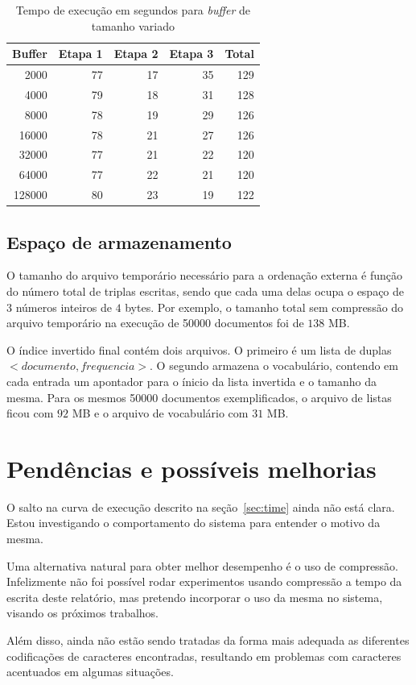 \documentclass[12pt]{article}
\begin{document}
\begin{table}[ht]
\centering
\caption{Tempo de execução em segundos para \emph{buffer} de tamanho variado}
\label{tab:exec_time_buffer}
\begin{tabular}{rrrrr}
Buffer  & Etapa 1 & Etapa 2 & Etapa 3 & Total \\ \hline
2000    & 77      & 17      & 35      & 129 \\
4000    & 79      & 18      & 31      & 128 \\
8000    & 78      & 19      & 29      & 126 \\
16000   & 78      & 21      & 27      & 126 \\
32000   & 77      & 21      & 22      & 120 \\
64000   & 77      & 22      & 21      & 120 \\
128000  & 80      & 23      & 19      & 122 \\

\end{tabular}
\end{table}


\subsection{Espaço de armazenamento}

O tamanho do arquivo temporário necessário para a ordenação externa é função do número total de triplas escritas, sendo que cada uma delas ocupa o espaço de $3$ números inteiros de $4$ bytes. Por exemplo, o tamanho total sem compressão do arquivo temporário na execução de 50000 documentos foi de $138$ MB.

O índice invertido final contém dois arquivos. O primeiro é um lista de duplas $<documento, frequencia>$. O segundo armazena o vocabulário, contendo em cada entrada um apontador para o ínicio da lista invertida e o tamanho da mesma. Para os mesmos 50000 documentos exemplificados, o arquivo de listas ficou com $92$ MB e o arquivo de vocabulário com $31$ MB.


\section{Pendências e possíveis melhorias}

O salto na curva de execução descrito na seção~\ref{sec:time} ainda não está clara. Estou investigando o comportamento do sistema para entender o motivo da mesma.

Uma alternativa natural para obter melhor desempenho é o uso de compressão. Infelizmente não foi possível rodar experimentos usando compressão a tempo da escrita deste relatório, mas pretendo incorporar o uso da mesma no sistema, visando os próximos trabalhos.

Além disso, ainda não estão sendo tratadas da forma mais adequada as diferentes codificações de caracteres encontradas, resultando em problemas com caracteres acentuados em algumas situações.

%
%
\end{document}
